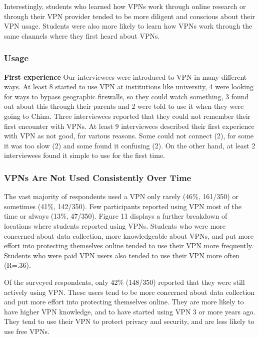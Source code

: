 Interestingly, students who learned how VPNs work through online research or
through their VPN provider tended to be more diligent and conscious about
their VPN usage. Students were also more likely to learn how VPNs work through
the same channels where they first heard about VPNs.







\subsubsection{Usage} \textbf{First experience} Our interviewees were
introduced to VPN in many different ways. At least 8 started to use VPN at
institutions like university, 4 were looking for ways to bypass geographic
firewalls, so they could watch something, 3 found out about this through their
parents and 2 were told to use it when they were going to China. Three
interviewees reported that they could not remember their first encounter with
VPNs.  At least 9 interviewees described their first experience with VPN as
not good, for various reasons. Some could not connect (2), for some it was too
slow (2) and some found it confusing (2).  On the other hand, at least 2
interviewees found it simple to use for the first time.


\subsubsection{VPNs Are Not Used Consistently Over Time}

The vast majority of respondents used a VPN only rarely (46\%, 161/350) or
sometimes (41\%, 142/350). Few participants reported using VPN most of the
time or always (13\%, 47/350). Figure 11 displays a further breakdown of
locations where students reported using VPNs. Students who were more concerned
about data collection, more knowledgeable about VPNs, and put more effort into
protecting themselves online tended to use their VPN more frequently. Students
who were paid VPN users also tended to use their VPN more often (R=.36).



Of the surveyed respondents, only 42\% (148/350) reported that they were still
actively using VPN. These users tend to be more concerned about data
collection and put more effort into protecting themselves online. They are
more likely to have higher VPN knowledge, and to have started using VPN 3 or
more years ago. They tend to use their VPN to protect privacy and security,
and are less likely to use free VPNs.

